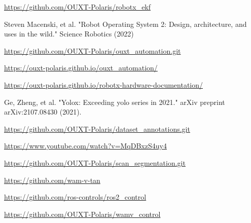 \documentclass[lettersize,journal]{IEEEtran}
\begin{document}
\begin{thebibliography}{1}

    \url{https://github.com/OUXT-Polaris/robotx_ekf}

    Steven Macenski, et al. "Robot Operating System 2: Design, architecture, and uses in the wild." Science Robotics (2022)

    \url{https://github.com/OUXT-Polaris/ouxt_automation.git}

    \url{https://ouxt-polaris.github.io/ouxt_automation/}

    \url{https://ouxt-polaris.github.io/robotx-hardware-documentation/}

    Ge, Zheng, et al. "Yolox: Exceeding yolo series in 2021." arXiv preprint arXiv:2107.08430 (2021).

    \url{https://github.com/OUXT-Polaris/dataset_annotations.git}

    \url{https://www.youtube.com/watch?v=MqDBxzS4uy4}

    \url{https://github.com/OUXT-Polaris/scan_segmentation.git}

    \url{https://github.com/wam-v-tan}

  \url{https://github.com/ros-controls/ros2_control}

  \url{https://github.com/OUXT-Polaris/wamv_control}

\end{thebibliography}

\vfill
\end{document}

